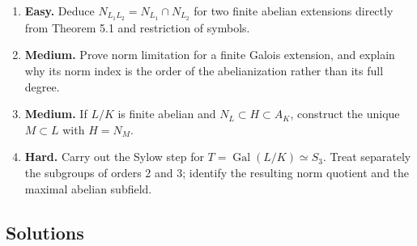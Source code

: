 \documentclass[11pt,a4paper]{article}
\newcommand{\tightlist}{\setlength{\itemsep}{0pt}\setlength{\parskip}{0pt}}
\begin{document}
\begin{enumerate}
\def\labelenumi{\arabic{enumi}.}
\tightlist
\item
  \textbf{Easy.} Deduce \(N_{L_1L_2}=N_{L_1}\cap N_{L_2}\) for two
  finite abelian extensions directly from Theorem 5.1 and restriction of
  symbols.
\item
  \textbf{Medium.} Prove norm limitation for a finite Galois extension,
  and explain why its norm index is the order of the abelianization
  rather than its full degree.
\item
  \textbf{Medium.} If \(L/K\) is finite abelian and
  \(N_L\subset H\subset A_K\), construct the unique \(M\subset L\) with
  \(H=N_M\).
\item
  \textbf{Hard.} Carry out the Sylow step for
  \(T=\operatorname{Gal}(L/K)\simeq S_3\). Treat separately the
  subgroups of orders 2 and 3; identify the resulting norm quotient and
  the maximal abelian subfield.
\end{enumerate}

\subsection{Solutions}\label{solutions}
\end{document}
